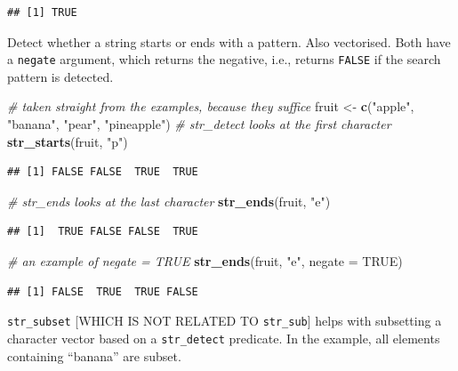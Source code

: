 \documentclass[]{book}
\newenvironment{Shaded}{}{}
\newcommand{\CommentTok}[1]{\textcolor[rgb]{0.38,0.63,0.69}{\textit{#1}}}
\newcommand{\DataTypeTok}[1]{\textcolor[rgb]{0.56,0.13,0.00}{#1}}
\newcommand{\KeywordTok}[1]{\textcolor[rgb]{0.00,0.44,0.13}{\textbf{#1}}}
\newcommand{\NormalTok}[1]{#1}
\newcommand{\OtherTok}[1]{\textcolor[rgb]{0.00,0.44,0.13}{#1}}
\newcommand{\StringTok}[1]{\textcolor[rgb]{0.25,0.44,0.63}{#1}}
\begin{document}
\begin{verbatim}
## [1] TRUE
\end{verbatim}

Detect whether a string starts or ends with a pattern. Also vectorised.
Both have a \texttt{negate} argument, which returns the negative, i.e., returns \texttt{FALSE} if the search pattern is detected.

\begin{Shaded}
\begin{Highlighting}[]
\CommentTok{# taken straight from the examples, because they suffice}
\NormalTok{fruit <-}\StringTok{ }\KeywordTok{c}\NormalTok{(}\StringTok{"apple"}\NormalTok{, }\StringTok{"banana"}\NormalTok{, }\StringTok{"pear"}\NormalTok{, }\StringTok{"pineapple"}\NormalTok{)}
\CommentTok{# str_detect looks at the first character}
\KeywordTok{str_starts}\NormalTok{(fruit, }\StringTok{"p"}\NormalTok{)}
\end{Highlighting}
\end{Shaded}

\begin{verbatim}
## [1] FALSE FALSE  TRUE  TRUE
\end{verbatim}

\begin{Shaded}
\begin{Highlighting}[]
\CommentTok{# str_ends looks at the last character}
\KeywordTok{str_ends}\NormalTok{(fruit, }\StringTok{"e"}\NormalTok{)}
\end{Highlighting}
\end{Shaded}

\begin{verbatim}
## [1]  TRUE FALSE FALSE  TRUE
\end{verbatim}

\begin{Shaded}
\begin{Highlighting}[]
\CommentTok{# an example of negate = TRUE}
\KeywordTok{str_ends}\NormalTok{(fruit, }\StringTok{"e"}\NormalTok{, }\DataTypeTok{negate =} \OtherTok{TRUE}\NormalTok{)}
\end{Highlighting}
\end{Shaded}

\begin{verbatim}
## [1] FALSE  TRUE  TRUE FALSE
\end{verbatim}

\texttt{str\_subset} {[}WHICH IS NOT RELATED TO \texttt{str\_sub}{]} helps with subsetting a character vector based on a \texttt{str\_detect} predicate.
In the example, all elements containing ``banana'' are subset.
\end{document}
